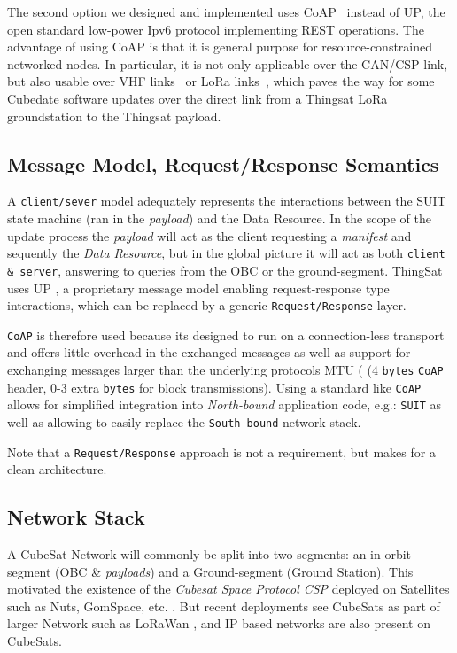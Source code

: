 The second option we designed and implemented uses CoAP~\cite{rfc7252} instead of UP, the open standard low-power Ipv6 protocol implementing REST operations.
The advantage of using CoAP is that it is general purpose for resource-constrained networked nodes. In particular, it is not only applicable over the CAN/CSP link, but also usable over VHF links~\cite{palma2018vhf-coap} or LoRa links~\cite{sanchez2018lora-coap}, which paves the way for some Cubedate software updates over the direct link from a Thingsat LoRa groundstation to the Thingsat payload.



\iffalse

\subsection{Message Model, Request/Response Semantics}

A \texttt{client/sever} model adequately represents the interactions between the SUIT state
machine (ran in the \textit{payload}) and the Data Resource. In the scope of the
update process the \textit{payload} will act as the client requesting a \textit{manifest}
and sequently the \textit{Data Resource}, but in the global picture it will act
as both \texttt{client \& server}, answering to queries from the OBC or the
ground-segment. ThingSat uses UP , a proprietary message
model enabling request-response type interactions, which can be replaced by a
generic \texttt{Request/Response} layer.

\texttt{CoAP} is therefore used because its designed to run on a connection-less transport
and offers little overhead in the exchanged messages as well as support for exchanging
messages larger than the underlying protocols MTU (
(4 \texttt{bytes} \texttt{CoAP} header, 0-3 extra \texttt{bytes} for block transmissions).
Using a standard like \texttt{CoAP} allows for simplified integration into \textit{North-bound}
application code, e.g.: \texttt{SUIT} as well as allowing to easily replace the
\texttt{South-bound} network-stack.

Note that a \texttt{Request/Response} approach is not a requirement, but makes
for a clean architecture.

\subsection{Network Stack}

A CubeSat Network will commonly be split into two segments: an in-orbit segment
(OBC \& \textit{payloads}) and a Ground-segment (Ground Station). This motivated
the existence of the \textit{Cubesat Space Protocol CSP} deployed on Satellites
such as Nuts, GomSpace, etc. . But recent deployments see CubeSats
as part of larger Network such as LoRaWan , and IP based
networks are also present on CubeSats.

